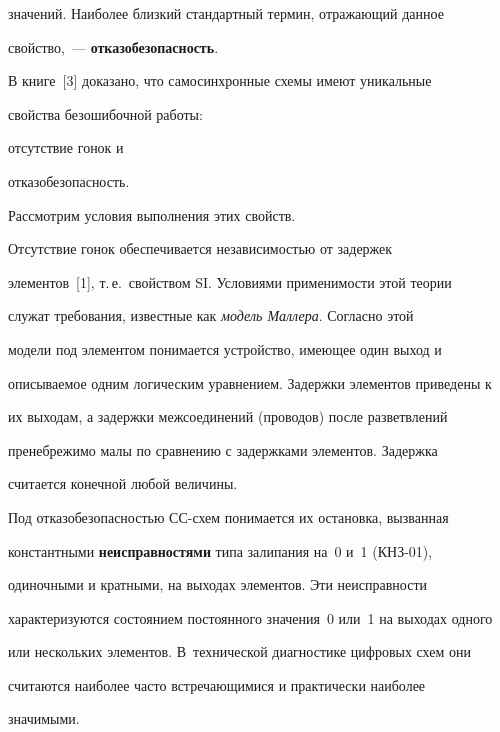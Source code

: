 значений. Наиболее близкий стандартный термин, отражающий данное 


свойство,~--- \textbf{отказобезопасность}.


      


      В книге~[3] доказано, что самосинхронные схемы имеют уникальные 


свойства безошибочной работы:


 отсутствие гонок и 


 отказобезопасность.





      


      Рассмотрим условия выполнения этих свойств.


      


      Отсутствие гонок обеспечивается независимостью от задержек 


элементов~[1], т.\,е.\ свойством SI. Условиями применимости этой теории 


служат требования, известные как \textit{модель Маллера}. Согласно этой 


модели под элементом понимается устройство, имеющее один выход и 


описываемое одним логическим уравнением. Задержки элементов приведены к 


их выходам, а задержки межсоединений (проводов) после разветвлений 


пренебрежимо малы по сравнению с задержками элементов. Задержка 


считается конечной любой величины.


      


      Под отказобезопасностью СС-схем понимается их остановка, вызванная 


константными \textbf{неисправностями} типа залипания на~0 и~1 (КНЗ-01), 


одиночными и кратными, на выходах элементов. Эти неисправности 


характеризуются состоянием постоянного значения~0 или~1 на выходах одного 


или нескольких элементов. В~технической диагностике цифровых схем они


считаются наиболее часто встречающимися и практически наиболее 


значимыми.


